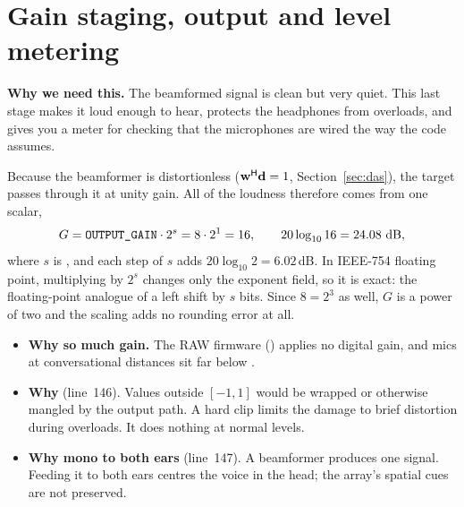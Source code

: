 \documentclass[11pt]{article}
\begin{document}
\section{Gain staging, output and level metering}\label{sec:gain}

\noindent\textbf{Why we need this.} The beamformed signal is clean but very quiet. This last
stage makes it loud enough to hear, protects the headphones from overloads, and gives you a meter
for checking that the microphones are wired the way the code assumes.



Because the beamformer is distortionless ($\mathbf{w}^{\mathsf H}\mathbf{d}=1$, Section~\ref{sec:das}), the target passes
through it at unity gain. All of the loudness therefore comes from one scalar,
\begin{equation}
  G=\code{OUTPUT_GAIN}\cdot2^{s}=8\cdot2^{1}=16,\qquad 20\log_{10}16=24.08\ \text{dB},
\end{equation}
where $s$ is , and each step of $s$ adds $20\log_{10}2=6.02$\,dB.
In IEEE-754 floating point, multiplying by $2^{s}$ changes only the exponent field, so it is
exact: the floating-point analogue of a left shift by $s$ bits. Since $8=2^3$ as well, $G$ is a
power of two and the scaling adds no rounding error at all.

\begin{rationale}
\begin{itemize}
\item \textbf{Why so much gain.} The RAW firmware () applies no digital
  gain, and  mics at conversational distances sit far below
  .
\item \textbf{Why } (line~146). Values outside $[-1,1]$ would be wrapped or otherwise mangled
  by the output path. A hard clip limits the damage to brief distortion during overloads. It
  does nothing at normal levels.
\item \textbf{Why mono to both ears} (line~147). A beamformer produces one signal. Feeding it to
  both ears centres the voice in the head; the array's spatial cues are not preserved.
\end{itemize}
\end{rationale}
\end{document}
